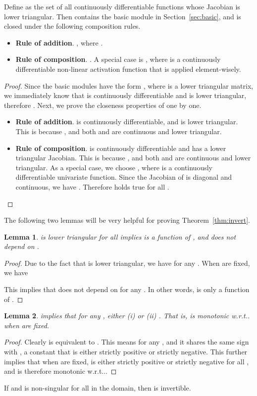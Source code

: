 \documentclass{article}
\makeatletter
\newtheorem{lemma}{Lemma}
\newenvironment{customthm}[1]
{\renewcommand\theinnercustomthm{#1}\innercustomthm}
{\endinnercustomthm}
\newenvironment{customprop}[1]
{\renewcommand\theinnercustomprop{#1}\innercustomprop}
{\endinnercustomprop}
\def\@onedot{\ifx\@let@token.\else.\null\fi\xspace}
\DeclareRobustCommand\onedot{\futurelet\@let@token\@onedot}
\newcommand{\secref}[1]{Section~\ref{#1}}
\newcommand{\thmref}[1]{Theorem~\ref{#1}}
\def\wrt{w.r.t\onedot}
\makeatother
\begin{document}
\begin{customprop}{\ref{prop:calculus}}
Define  as the set of all continuously differentiable functions whose Jacobian is lower triangular. Then  contains the basic module in \secref{sec:basic}, and is closed under the following composition rules.
\begin{itemize}
   \item \textbf{Rule of addition}. , where . \item \textbf{Rule of composition}. . A special case is , where  is a continuously differentiable non-linear activation function that is applied element-wisely.
\end{itemize}
\end{customprop}
\begin{proof}
    Since the basic modules have the form , where  is a lower triangular matrix, we immediately know that  is continuously differentiable and  is lower triangular, therefore . Next, we prove the closeness properties of  one by one.
    \begin{itemize}
        \item \textbf{Rule of addition}.  is continuously differentiable, and  is lower triangular. This is because , and both  and  are continuous and lower triangular.
        
        \item \textbf{Rule of composition}.  is continuously differentiable and has a lower triangular Jacobian. This is because , and both  and  are continuous and lower triangular. As a special case, we choose , where  is a continuously differentiable univariate function. Since the Jacobian of  is diagonal and continuous, we have . Therefore  holds true for all .
    \end{itemize}
\end{proof}

The following two lemmas will be very helpful for proving \thmref{thm:invert}.
\begin{lemma}
\label{condition1}
 is lower triangular for all  implies  is a function of , and does not depend on .
\end{lemma}
\begin{proof}
Due to the fact that  is lower triangular, we have  for any . When  are fixed, we have


This implies that  does not depend on  for any . In other words,  is only a function of .
\end{proof}
\begin{lemma}
\label{condition2}
 implies that for any , either (i)  or (ii) . That is,  is monotonic \wrt  when  are fixed.
\end{lemma}
\begin{proof}
Clearly  is equivalent to . This means for any ,  and it shares the same sign with , a constant that is either strictly positive or strictly negative. This further implies that when  are fixed,  is either strictly positive or strictly negative for all , and  is therefore monotonic \wrt .
\end{proof}
\begin{customthm}{\ref{thm:invert}}
If  and  is non-singular for all  in the domain, then  is invertible.
\end{customthm}
\end{document}
